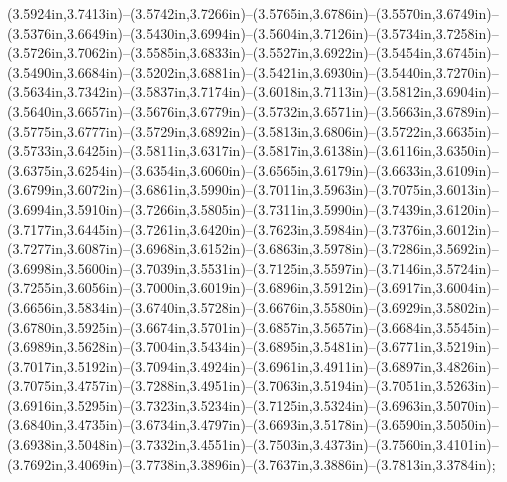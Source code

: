 (3.5924in,3.7413in)--(3.5742in,3.7266in)--(3.5765in,3.6786in)--(3.5570in,3.6749in)--(3.5376in,3.6649in)--(3.5430in,3.6994in)--(3.5604in,3.7126in)--(3.5734in,3.7258in)--(3.5726in,3.7062in)--(3.5585in,3.6833in)--(3.5527in,3.6922in)--(3.5454in,3.6745in)--(3.5490in,3.6684in)--(3.5202in,3.6881in)--(3.5421in,3.6930in)--(3.5440in,3.7270in)--(3.5634in,3.7342in)--(3.5837in,3.7174in)--(3.6018in,3.7113in)--(3.5812in,3.6904in)--(3.5640in,3.6657in)--(3.5676in,3.6779in)--(3.5732in,3.6571in)--(3.5663in,3.6789in)--(3.5775in,3.6777in)--(3.5729in,3.6892in)--(3.5813in,3.6806in)--(3.5722in,3.6635in)--(3.5733in,3.6425in)--(3.5811in,3.6317in)--(3.5817in,3.6138in)--(3.6116in,3.6350in)--(3.6375in,3.6254in)--(3.6354in,3.6060in)--(3.6565in,3.6179in)--(3.6633in,3.6109in)--(3.6799in,3.6072in)--(3.6861in,3.5990in)--(3.7011in,3.5963in)--(3.7075in,3.6013in)--(3.6994in,3.5910in)--(3.7266in,3.5805in)--(3.7311in,3.5990in)--(3.7439in,3.6120in)--(3.7177in,3.6445in)--(3.7261in,3.6420in)--(3.7623in,3.5984in)--(3.7376in,3.6012in)--(3.7277in,3.6087in)--(3.6968in,3.6152in)--(3.6863in,3.5978in)--(3.7286in,3.5692in)--(3.6998in,3.5600in)--(3.7039in,3.5531in)--(3.7125in,3.5597in)--(3.7146in,3.5724in)--(3.7255in,3.6056in)--(3.7000in,3.6019in)--(3.6896in,3.5912in)--(3.6917in,3.6004in)--(3.6656in,3.5834in)--(3.6740in,3.5728in)--(3.6676in,3.5580in)--(3.6929in,3.5802in)--(3.6780in,3.5925in)--(3.6674in,3.5701in)--(3.6857in,3.5657in)--(3.6684in,3.5545in)--(3.6989in,3.5628in)--(3.7004in,3.5434in)--(3.6895in,3.5481in)--(3.6771in,3.5219in)--(3.7017in,3.5192in)--(3.7094in,3.4924in)--(3.6961in,3.4911in)--(3.6897in,3.4826in)--(3.7075in,3.4757in)--(3.7288in,3.4951in)--(3.7063in,3.5194in)--(3.7051in,3.5263in)--(3.6916in,3.5295in)--(3.7323in,3.5234in)--(3.7125in,3.5324in)--(3.6963in,3.5070in)--(3.6840in,3.4735in)--(3.6734in,3.4797in)--(3.6693in,3.5178in)--(3.6590in,3.5050in)--(3.6938in,3.5048in)--(3.7332in,3.4551in)--(3.7503in,3.4373in)--(3.7560in,3.4101in)--(3.7692in,3.4069in)--(3.7738in,3.3896in)--(3.7637in,3.3886in)--(3.7813in,3.3784in);
